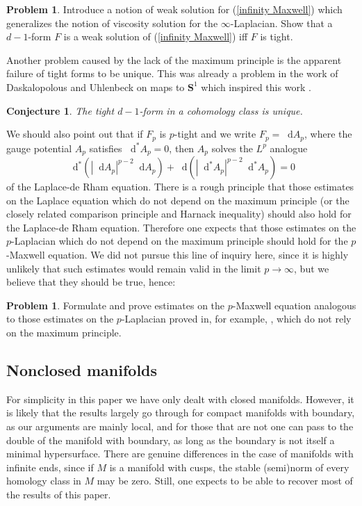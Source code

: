 \documentclass[reqno,11pt]{amsart}
\newcommand{\Sph}{\mathbf S}
\newcommand*\dif{\mathop{}\!\mathrm{d}}
\newtheorem{conjecture}[theorem]{Conjecture}
\theoremstyle{definition}
\newtheorem{problem}[theorem]{Problem}
\numberwithin{equation}{section}
\begin{document}
\begin{problem}
Introduce a notion of weak solution for (\ref{infinity Maxwell}) which generalizes the notion of viscosity solution for the $\infty$-Laplacian.
Show that a $d - 1$-form $F$ is a weak solution of (\ref{infinity Maxwell}) iff $F$ is tight.
\end{problem}

Another problem caused by the lack of the maximum principle is the apparent failure of tight forms to be unique.
This was already a problem in the work of Daskalopolous and Uhlenbeck on maps to $\Sph^1$ which inspired this work \cite[Conjecture 9.2]{daskalopoulos2020transverse}.

\begin{conjecture}
The tight $d - 1$-form in a cohomology class is unique.
\end{conjecture}

We should also point out that if $F_p$ is $p$-tight and we write $F_p = \dif A_p$, where the gauge potential $A_p$ satisfies $\dif^* A_p = 0$, then $A_p$ solves the $L^p$ analogue 
$$\dif^*(|\dif A_p|^{p - 2} \dif A_p) + \dif(|\dif^* A_p|^{p - 2} \dif^* A_p) = 0$$
of the Laplace-de Rham equation. 
There is a rough principle that those estimates on the Laplace equation which do not depend on the maximum principle (or the closely related comparison principle and Harnack inequality) should also hold for the Laplace-de Rham equation.
Therefore one expects that those estimates on the $p$-Laplacian which do not depend on the maximum principle should hold for the $p$-Maxwell equation.
We did not pursue this line of inquiry here, since it is highly unlikely that such estimates would remain valid in the limit $p \to \infty$, but we believe that they should be true, hence:

\begin{problem}
Formulate and prove estimates on the $p$-Maxwell equation analogous to those estimates on the $p$-Laplacian proved in, for example, \cite[Chapter 11]{kinnunen2021maximal}, which do not rely on the maximum principle.
\end{problem}


\subsection{Nonclosed manifolds}
For simplicity in this paper we have only dealt with closed manifolds.
However, it is likely that the results largely go through for compact manifolds with boundary, as our arguments are mainly local, and for those that are not one can pass to the double of the manifold with boundary, as long as the boundary is not itself a minimal hypersurface.
There are genuine differences in the case of manifolds with infinite ends, since if $M$ is a manifold with cusps, the stable (semi)norm of every homology class in $M$ may be zero.
Still, one expects to be able to recover most of the results of this paper.
\end{document}
